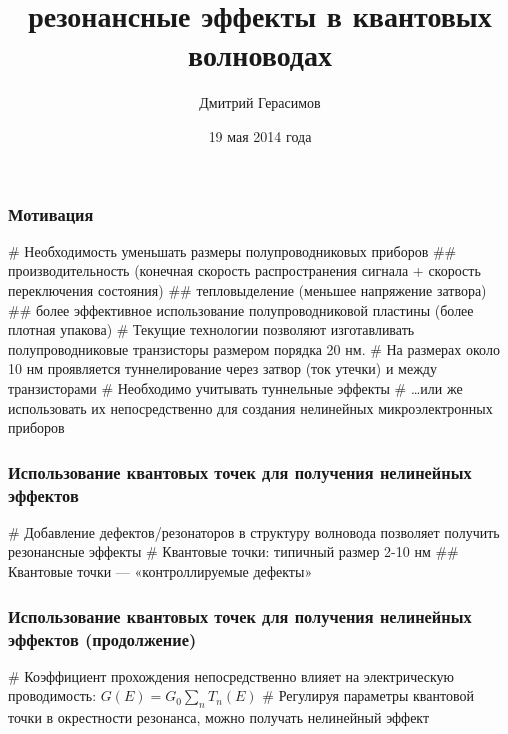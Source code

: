 \documentclass{beamer}
\title[]{\todo{Метод R-матриц и} резонансные эффекты в квантовых волноводах}
\author{Дмитрий Герасимов}
\institute[ИТМО]{Университет ИТМО}
\date{19 мая 2014 года}
\begin{document}
\maketitle

\begin{frame}[fragile]
\frametitle{Мотивация}
\begin{easylist}[itemize]
# Необходимость уменьшать размеры полупроводниковых приборов
## производительность (конечная скорость распространения сигнала + скорость переключения состояния)
## тепловыделение (меньшее напряжение затвора)
## более эффективное использование полупроводниковой пластины (более плотная упакова)
# Текущие технологии позволяют изготавливать полупроводниковые транзисторы размером порядка 20 нм.
# На размерах около 10 нм проявляется туннелирование через затвор (ток утечки) и между транзисторами
# Необходимо учитывать туннельные эффекты
# \dots или же использовать их непосредственно для создания нелинейных микроэлектронных приборов
\end{easylist}
\end{frame}

\begin{frame}[fragile]
\frametitle{Использование квантовых точек для получения нелинейных эффектов}
\begin{easylist}[itemize]
# Добавление дефектов/резонаторов в структуру волновода позволяет получить резонансные эффекты
# Квантовые точки: типичный размер 2-10 нм
## Квантовые точки — «контроллируемые дефекты»
\end{easylist}
\end{frame}


\begin{frame}[fragile]
\frametitle{Использование квантовых точек для получения нелинейных эффектов (продолжение)}
\begin{easylist}[itemize]
# Коэффициент прохождения непосредственно влияет на электрическую проводимость: $G(E) = G_0 \sum\limits_n T_n(E)$
# Регулируя параметры квантовой точки в окрестности резонанса, можно получать нелинейный эффект
\end{easylist}
\end{frame}
\end{document}
